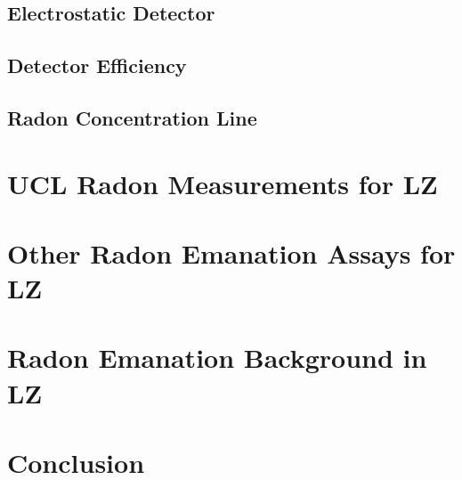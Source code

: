 \subsection{Electrostatic Detector}
\label{secsec:electrostatic_detector}



\subsection{Detector Efficiency}
\label{secsec:rn_detection_techniques}



\subsection{Radon Concentration Line}
\label{secsec:concentration_line}






\section{UCL Radon Measurements for LZ}
\label{sec:uclradon}


\section{Other Radon Emanation Assays for LZ}
\label{sec:otherradon}


\section{Radon Emanation Background in LZ}
\label{sec:lzradon}

\section{Conclusion}